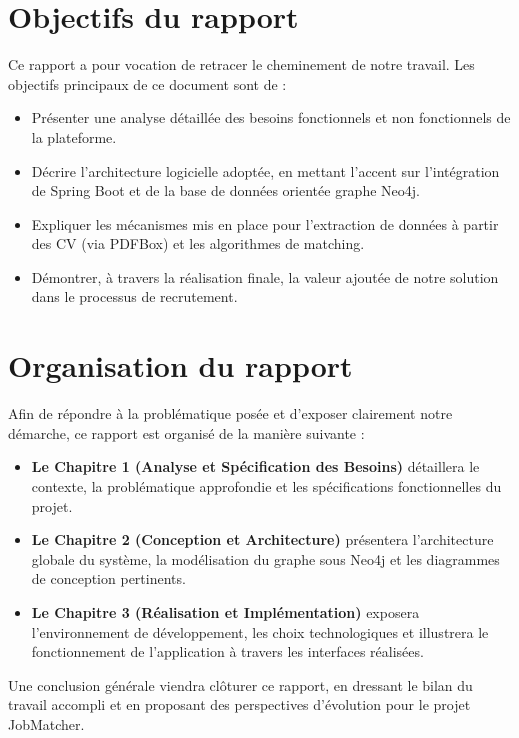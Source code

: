 \documentclass[12pt,a4paper]{report}
\begin{document}
\section*{Objectifs du rapport}
Ce rapport a pour vocation de retracer le cheminement de notre travail. Les objectifs principaux de ce document sont de :
\begin{itemize}
    \item Présenter une analyse détaillée des besoins fonctionnels et non fonctionnels de la plateforme.
    \item Décrire l'architecture logicielle adoptée, en mettant l'accent sur l'intégration de Spring Boot et de la base de données orientée graphe Neo4j.
    \item Expliquer les mécanismes mis en place pour l'extraction de données à partir des CV (via PDFBox) et les algorithmes de matching.
    \item Démontrer, à travers la réalisation finale, la valeur ajoutée de notre solution dans le processus de recrutement.
\end{itemize}

\section*{Organisation du rapport}
Afin de répondre à la problématique posée et d'exposer clairement notre démarche, ce rapport est organisé de la manière suivante :
\begin{itemize}
    \item \textbf{Le Chapitre 1 (Analyse et Spécification des Besoins)} détaillera le contexte, la problématique approfondie et les spécifications fonctionnelles du projet.
    \item \textbf{Le Chapitre 2 (Conception et Architecture)} présentera l'architecture globale du système, la modélisation du graphe sous Neo4j et les diagrammes de conception pertinents.
    \item \textbf{Le Chapitre 3 (Réalisation et Implémentation)} exposera l'environnement de développement, les choix technologiques et illustrera le fonctionnement de l'application à travers les interfaces réalisées.
\end{itemize}
Une conclusion générale viendra clôturer ce rapport, en dressant le bilan du travail accompli et en proposant des perspectives d'évolution pour le projet JobMatcher.

\end{document}
